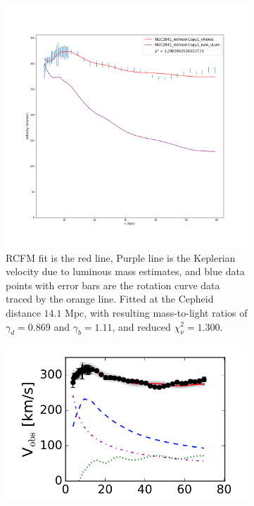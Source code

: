 \documentclass[reprint,%
 amsmath,amssymb,
 aps,
]{revtex4-1}
\begin{document}
 \begin{figure}[ht] 
  \begin{subfigure}[b]{0.5\linewidth}
    \centering
    \includegraphics[width=0.95\linewidth]{Updated_Graphs_withnewcolorsandfonts/NGC2841_rotmod-Copy1_XueSofue.png} 
    \caption{  RCFM fit is the red line,  Purple line is the Keplerian velocity due to  luminous mass estimates, and blue data points with error bars are the rotation curve data traced by the orange line.
  Fitted at the 
      Cepheid distance $14.1$ Mpc, with resulting mass-to-light ratios of  $\gamma_d =0.869 $    and $\gamma_b =1.11$, and  reduced  $\chi^2_\nu = 1.300$.  } 
    \label{fig:ngc2841RCFMfit} 
    \vspace{4ex}
  \end{subfigure}%
  \begin{subfigure}[b]{0.5\linewidth}
    \centering
    \includegraphics[width=0.95\linewidth]{figures/NGC2841_RarResults_Li2018}

\end{subfigure}
\end{figure}
\end{document}
